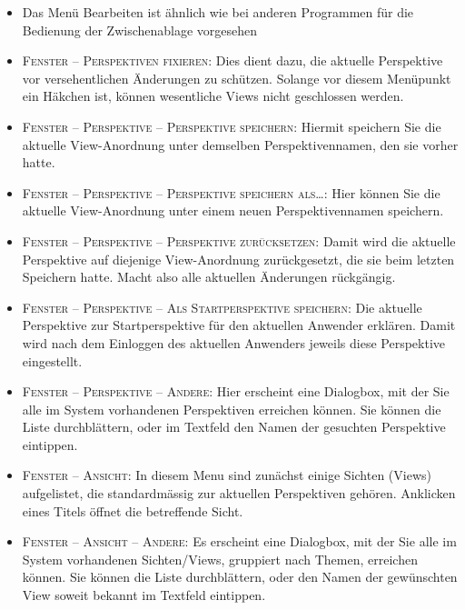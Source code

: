 \begin{itemize}
{  sein.}
  \item {Das Menü \glqq Bearbeiten\grqq{} ist ähnlich wie bei anderen Programmen
  für die Bedienung der Zwischenablage vorgesehen}
  \item {\textsc{Fenster -- Perspektiven fixieren}: Dies dient dazu, die
  aktuelle Perspektive vor versehentlichen Änderungen zu schützen. Solange vor
  diesem Menüpunkt ein Häkchen ist, können wesentliche Views nicht geschlossen
  werden.}
  \item {\textsc{Fenster -- Perspektive -- Perspektive speichern}: Hiermit
  speichern Sie die aktuelle View-Anordnung unter demselben Perspektivennamen,
  den sie vorher hatte.}
  \item {\textsc{Fenster -- Perspektive -- Perspektive speichern als\ldots}:
  Hier können Sie die aktuelle View-Anordnung unter einem neuen
  Perspektivennamen speichern.}
  \item {\textsc{Fenster -- Perspektive -- Perspektive zurücksetzen}: Damit wird
  die aktuelle Perspektive auf diejenige View-Anordnung zurückgesetzt, die sie
  beim letzten Speichern hatte. Macht also alle aktuellen Änderungen
  rückgängig.}
  \item {\textsc{Fenster -- Perspektive -- Als Startperspektive speichern}: Die
  aktuelle Perspektive zur Startperspektive für den aktuellen Anwender erklären.
  Damit wird nach dem Einloggen des aktuellen Anwenders jeweils diese
  Perspektive eingestellt.}
  \item {\textsc{Fenster -- Perspektive -- Andere}: Hier erscheint eine
  Dialogbox, mit der Sie alle im System vorhandenen Perspektiven erreichen
  können. Sie können die Liste durchblättern, oder im Textfeld den Namen der
  gesuchten Perspektive eintippen.}
  \item {\textsc{Fenster -- Ansicht}: In diesem Menu sind zunächst einige
  Sichten (Views) aufgelistet, die standardmässig zur aktuellen Perspektiven
  gehören. Anklicken eines Titels öffnet die betreffende Sicht.}
  \item {\textsc{Fenster -- Ansicht -- Andere}: Es erscheint eine Dialogbox, mit
  der Sie alle im System vorhandenen Sichten/Views, gruppiert nach Themen, erreichen
  können. Sie können die Liste durchblättern, oder den Namen der gewünschten
  View soweit bekannt im Textfeld eintippen.}
\end{itemize}

